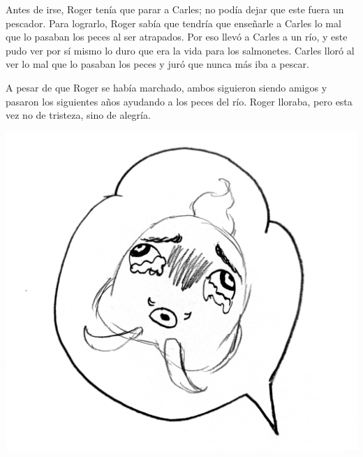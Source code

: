 \documentclass[letterpaper,11pt]{report}
\begin{document}
Antes de irse, Roger tenía que parar a Carles; no podía dejar que este fuera un pescador. Para lograrlo, Roger sabía que tendría que enseñarle a Carles lo mal que lo pasaban los peces al ser atrapados. Por eso llevó a Carles a un río, y este pudo ver por sí mismo lo duro que era la vida para los salmonetes. Carles lloró al ver lo mal que lo pasaban los peces y juró que nunca más iba a pescar.

A pesar de que Roger se había marchado, ambos siguieron siendo amigos y pasaron los siguientes años ayudando a los peces del río. Roger lloraba, pero esta vez no de tristeza, sino de alegría.


\vspace*{\fill}
\begin{center}
    \includegraphics[width=1\textwidth]{4}
\end{center}
\end{document}
